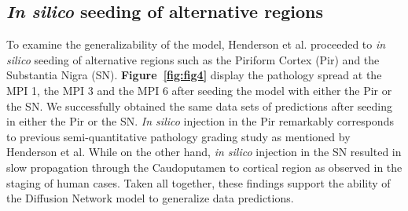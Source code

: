 \subsection{\textit{In silico} seeding of alternative regions}
To examine the generalizability of the model, Henderson et al. proceeded to \textit{in silico} seeding of alternative regions such as the Piriform Cortex (Pir) and the Substantia Nigra (SN). \textbf{Figure~\ref{fig:fig4}} display the pathology spread at the MPI 1, the MPI 3 and the MPI 6 after seeding the model with either the Pir or the SN. We successfully obtained the same data sets of predictions after seeding in either the Pir or the SN. \textit{In silico} injection in the Pir remarkably corresponds to previous semi-quantitative pathology grading study as mentioned by Henderson et al. \cite{Rey_2016} While on the other hand, \textit{in silico} injection in the SN resulted in slow propagation through the Caudoputamen to cortical region as observed in the staging of human cases. Taken all together, these findings support the ability of the Diffusion Network model to generalize data predictions.

